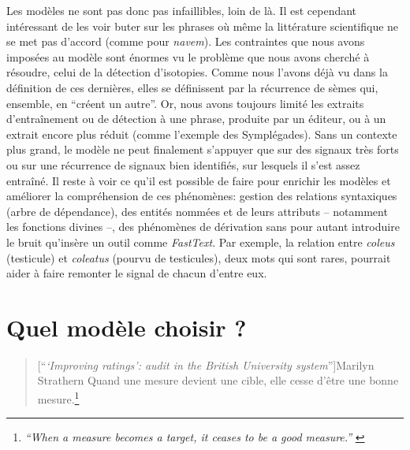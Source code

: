 Les modèles ne sont pas donc pas infaillibles, loin de là. Il est cependant intéressant de les voir buter sur les phrases où même la littérature scientifique ne se met pas d'accord (comme pour \textit{navem}). Les contraintes que nous avons imposées au modèle sont énormes vu le problème que nous avons cherché à résoudre, celui de la détection d'isotopies. Comme nous l'avons déjà vu dans la définition de ces dernières, elles se définissent par la récurrence de sèmes qui, ensemble, en \enquote{créent un autre}. Or, nous avons toujours limité les extraits d'entraînement ou de détection à une phrase, produite par un éditeur, ou à un extrait encore plus réduit (comme l'exemple des Symplégades). Sans un contexte plus grand, le modèle ne peut finalement s'appuyer que sur des signaux très forts ou sur une récurrence de signaux bien identifiés, sur lesquels il s'est assez entraîné. Il reste à voir ce qu'il est possible de faire pour enrichir les modèles et améliorer la compréhension de ces phénomènes: gestion des relations syntaxiques (arbre de dépendance), des entités nommées et de leurs attributs -- notamment les fonctions divines --, des phénomènes de dérivation sans pour autant introduire le bruit qu'insère un outil comme \textit{FastText}. Par exemple, la relation entre \textit{coleus} (testicule) et \textit{coleatus} (pourvu de testicules), deux mots qui sont rares, pourrait aider à faire remonter le signal de chacun d'entre eux. %





\section{Quel modèle choisir ?}

\begin{quote}[\enquote{\textit{‘Improving ratings’: audit in the British University system}}]{Marilyn Strathern}
    Quand une mesure devient une cible, elle cesse d'être une bonne mesure.\footnote{\textit{\enquote{When a measure becomes a target, it ceases to be a good measure.}} \textcite{strathern_improving_1997}}
\end{quote}

